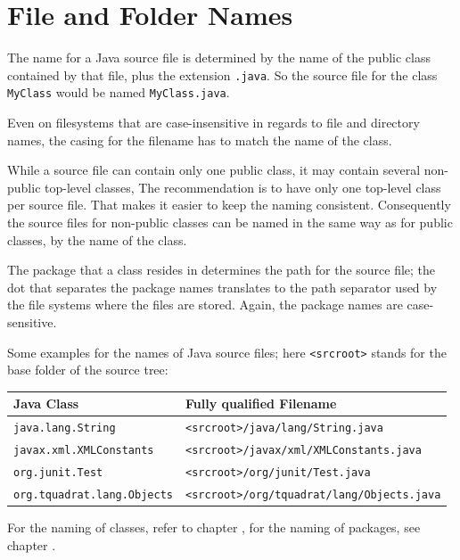 \section{File and Folder Names}\label{sec:FileNames}
The name for a Java source file is determined by the name of the public class contained by that file, plus the extension \verb#.java#. So the source file for the class \lstinline|MyClass| would be named \verb#MyClass.java#.

Even on filesystems that are case-insensitive in regards to file and directory names, the casing for the filename has to match the name of the class. 

While a source file can contain only one public class, it may contain several non-public top-level classes, The recommendation is to have only one top-level class per source file. That makes it easier to keep the naming consistent. Consequently the source files for non-public classes can be named in the same way as for public classes, by the name of the class.

The package that a class resides in determines the path for the source file; the dot that separates the package names translates to the path separator used by the file systems where the files are stored. Again, the package names are case-sensitive.

Some examples for the names of Java source files; here \verb#<srcroot># stands for the base folder of the source tree:

\begin{tabular}{|l|l|}
\hline 
\textbf{Java Class} & \textbf{Fully qualified Filename} \\ 
\hline 
\lstinline|java.lang.String| & \verb#<srcroot>/java/lang/String.java# \\ 
\lstinline|javax.xml.XMLConstants| & \verb#<srcroot>/javax/xml/XMLConstants.java# \\ 
\lstinline|org.junit.Test| & \verb#<srcroot>/org/junit/Test.java# \\ 
\lstinline|org.tquadrat.lang.Objects| & \verb#<srcroot>/org/tquadrat/lang/Objects.java# \\ 
\hline 
\end{tabular}

For the naming of classes, refer to chapter , for the naming of packages, see chapter .

